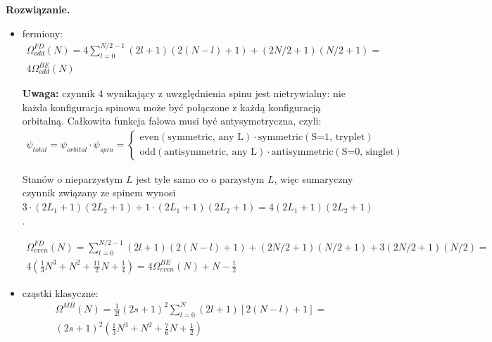 \documentclass[11pt,a4paper]{article}
\newenvironment{solution}{\vspace{1cm} \par\textbf{Rozwiązanie.} \vspace{1cm}}{}
\begin{document}
\begin{solution}
\begin{itemize}
W przypadku parzystego $N$ musimy uwzględnić oddzielnie 
konfigurację $l_1 = l_2 = N/2$, która jest jedyną konfiguracją, 
w której obie cząstki mają ten sam stan energetyczny.

\begin{align*}
\Omega_{even}^{BE}(N) = 
\sum_{l=0}^{N/2-1} (2l+1)(2(N-l)+1) + (2N/2+1)(N/2+1) = \\
\frac{1}{3}N^3 + N^2 + \frac{5}{3}N + 1
\end{align*}

\item fermiony:
\begin{align*}
\Omega_{odd}^{FD}(N) = 
4\sum_{l=0}^{N/2-1} (2l+1)(2(N-l)+1) + (2N/2+1)(N/2+1) = \\
4 \Omega_{odd}^{BE}(N)
\end{align*}

{\bf Uwaga:} czynnik 4 wynikający z uwzględnienia spinu jest nietrywialny:
nie każda konfiguracja spinowa może być połączone z każdą konfiguracją orbitalną.
Całkowita funkcja falowa musi być antysymetryczna, czyli:
\begin{align*}
\psi_{total} = \psi_{orbital} \cdot \psi_{spin} = 
\begin{cases}
\text{even} (\text{symmetric, any L}) \cdot \text{symmetric} (\text{S=1, tryplet}) \\
\text{odd} (\text{antisymmetric, any L}) \cdot \text{antisymmetric} (\text{S=0, singlet})
\end{cases}
\end{align*}

Stanów o nieparzystym $L$ jest tyle samo co o parzystym $L$, więc
sumaryczny czynnik związany ze spinem wynosi 
$3 \cdot (2L_1+1)(2L_2+1) + 1 \cdot (2L_1+1)(2L_2+1) = 4 (2L_1+1)(2L_2+1)$.

\begin{align*}
\Omega_{even}^{FD}(N) = 
\sum_{l=0}^{N/2-1} (2l+1)(2(N-l)+1) + (2N/2+1)(N/2+1) + 3(2N/2+1)(N/2) = \\
4 \left( \frac{1}{3}N^3 + N^2 + \frac{11}{2}N + \frac{1}{4} \right) = 
4 \Omega_{even}^{BE}(N) + N - \frac{1}{2}
\end{align*}
  
\item cząstki klasyczne:
\begin{align*}
\Omega^{MB}(N) = \frac{1}{2!}(2s+1)^{2}\sum_{l=0}^{N} (2l+1)[2(N-l)+1] = \\
(2s+1)^{2} \left(\frac{1}{3}N^3 + N^2 + \frac{7}{6}N + \frac{1}{2}\right)
\end{align*}
\end{itemize}


\end{solution}
\end{document}
